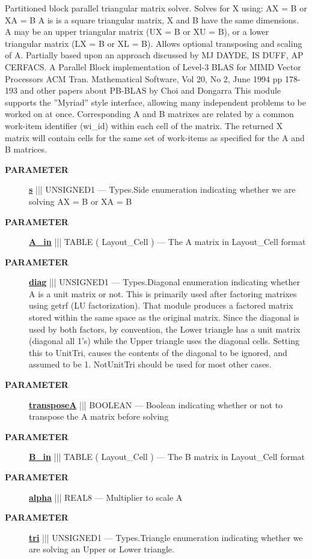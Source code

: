 Partitioned block parallel triangular matrix solver. Solves for X using: AX = B or XA = B A is is a square triangular matrix, X and B have the same dimensions. A may be an upper triangular matrix (UX = B or XU = B), or a lower triangular matrix (LX = B or XL = B). Allows optional transposing and scaling of A. Partially based upon an approach discussed by MJ DAYDE, IS DUFF, AP CERFACS. A Parallel Block implementation of Level-3 BLAS for MIMD Vector Processors ACM Tran. Mathematical Software, Vol 20, No 2, June 1994 pp 178-193 and other papers about PB-BLAS by Choi and Dongarra This module supports the ''Myriad'' style interface, allowing many independent problems to be worked on at once. Corresponding A and B matrixes are related by a common work-item identifier (wi\_id) within each cell of the matrix. The returned X matrix will contain cells for the same set of work-items as specified for the A and B matrices.






\par
\begin{description}
\item [\colorbox{tagtype}{\color{white} \textbf{\textsf{PARAMETER}}}] \textbf{\underline{s}} ||| UNSIGNED1 --- Types.Side enumeration indicating whether we are solving AX = B or XA = B
\item [\colorbox{tagtype}{\color{white} \textbf{\textsf{PARAMETER}}}] \textbf{\underline{A\_in}} ||| TABLE ( Layout\_Cell ) --- The A matrix in Layout\_Cell format
\item [\colorbox{tagtype}{\color{white} \textbf{\textsf{PARAMETER}}}] \textbf{\underline{diag}} ||| UNSIGNED1 --- Types.Diagonal enumeration indicating whether A is a unit matrix or not. This is primarily used after factoring matrixes using getrf (LU factorization). That module produces a factored matrix stored within the same space as the original matrix. Since the diagonal is used by both factors, by convention, the Lower triangle has a unit matrix (diagonal all 1's) while the Upper triangle uses the diagonal cells. Setting this to UnitTri, causes the contents of the diagonal to be ignored, and assumed to be 1. NotUnitTri should be used for most other cases.
\item [\colorbox{tagtype}{\color{white} \textbf{\textsf{PARAMETER}}}] \textbf{\underline{transposeA}} ||| BOOLEAN --- Boolean indicating whether or not to transpose the A matrix before solving
\item [\colorbox{tagtype}{\color{white} \textbf{\textsf{PARAMETER}}}] \textbf{\underline{B\_in}} ||| TABLE ( Layout\_Cell ) --- The B matrix in Layout\_Cell format
\item [\colorbox{tagtype}{\color{white} \textbf{\textsf{PARAMETER}}}] \textbf{\underline{alpha}} ||| REAL8 --- Multiplier to scale A
\item [\colorbox{tagtype}{\color{white} \textbf{\textsf{PARAMETER}}}] \textbf{\underline{tri}} ||| UNSIGNED1 --- Types.Triangle enumeration indicating whether we are solving an Upper or Lower triangle.
\end{description}







